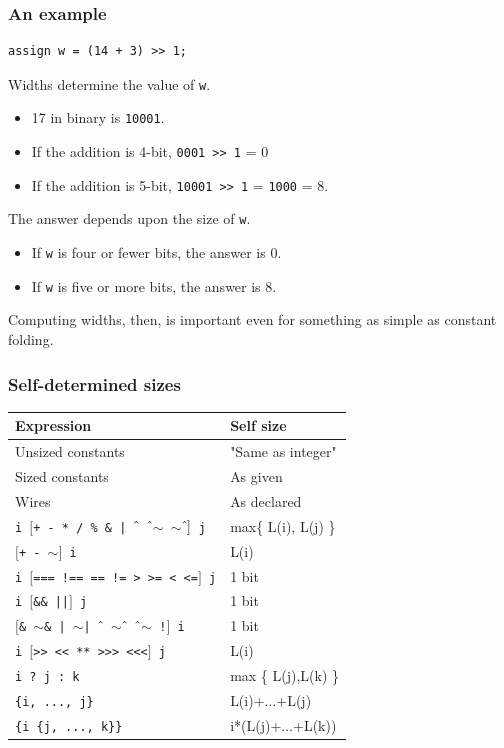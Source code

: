\documentclass[mathserif]{beamer}
\begin{document}
\begin{frame}[fragile]
\frametitle{An example}

\begin{verbatim}
assign w = (14 + 3) >> 1;
\end{verbatim}

Widths determine the value of {\tt w}.
\begin{itemize} 
\item 17 in binary is {\tt 10001}.
\item If the addition is 4-bit, {\tt 0001 >> 1} = 0
\item If the addition is 5-bit, {\tt 10001 >> 1} = {\tt 1000} = 8.
\end{itemize}

\bigskip
The answer depends upon the size of {\tt w}.  
\begin{itemize}
\item If {\tt w} is four or fewer bits, the answer is 0.
\item If {\tt w} is five or more bits, the answer is 8.
\end{itemize}

\bigskip
Computing widths, then, is important even for something as simple as constant
folding.

\end{frame}


\begin{frame}
\frametitle{Self-determined sizes}

\begin{tabular}{ll}
{\bf Expression} & {\bf Self size} \\
\hline
Unsized constants & "Same as integer" \\
Sized constants   & As given \\
Wires             & As declared \\
{\tt i $[$+ - * / \% \& | $\Hat{\ }$ $\Hat{\ }$$\sim$ $\sim$$\Hat{\ }]$ j} & max\{ L(i), L(j) \} \\
{\tt $[$+ - $\sim]$ i} &                     L(i) \\
{\tt i $[$=== !== == != > >= < <=$]$ j} &  1 bit \\
{\tt i $[$\&\& ||$]$ j}                  &  1 bit \\
{\tt $[$\& $\sim$\& | $\sim$| $\Hat{\ }$ $\sim$$\Hat{\ }$ $\Hat{\ }$$\sim$ !$]$ i}  & 1 bit \\
{\tt i $[$>> << ** >>> <<<$]$ j} &         L(i) \\
{\tt i~?~j~:~k}                  & max \{ L(j),L(k) \} \\
{\tt \{i, ..., j\}}              & L(i)+$\dots$+L(j) \\
{\tt \{i \{j, ..., k\}\}}        & i*(L(j)+$\dots$+L(k)) \\
\hline
\end{tabular}
\end{frame}
\end{document}
